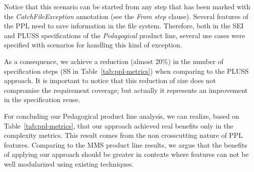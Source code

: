 \documentclass{acm_proc_article-sp}
\begin{document}
    
Notice that this scenario can be started from any step that has been marked with the \emph{CatchFileException} annotation (see the \emph{From step} clause). Several features of the PPL need to save information in the file system. Therefore, both in the SEI and PLUSS specifications of the \emph{Pedagogical} product line, several use cases were specified with scenarios for handling this kind of exception.

As a consequence, we achieve a reduction (almost 20\%) in the number of specification steps (SS in Table~\ref{tab:ppl-metrics}) when comparing to the PLUSS approach. It is important to notice that this reduction of size does not compromise the requirement coverage; but actually it represents an improvement in the specification reuse.

For concluding our Pedagogical product line analysis, we can realize, based on Table~\ref{tab:ppl-metrics}, that our approach achieved real benefits only in the complexity metrics. This result comes from the non crosscutting nature of PPL features. Comparing to the MMS product line results, we argue that the benefits of applying our approach should be greater in contexts where features can not be well modularized using existing techniques. 
   
\end{document}
